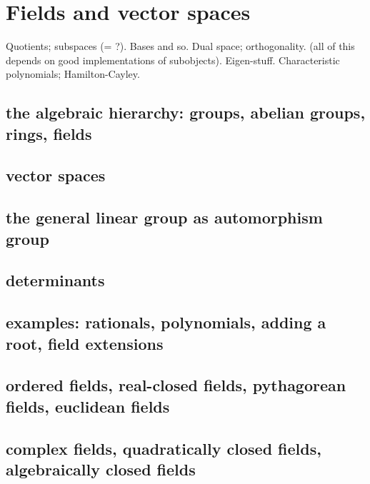 \chapter{Fields and vector spaces}
\label{ch:fields}

Quotients; subspaces (= ?). Bases and so. Dual space; orthogonality. (all of this depends on good implementations of subobjects). Eigen-stuff. Characteristic polynomials; Hamilton-Cayley.
\section{the algebraic hierarchy: groups, abelian groups, rings, fields}
\section{vector spaces}
\section{the general linear group as automorphism group}
\section{determinants\titledagger}
\section{examples: rationals, polynomials, adding a root, field extensions}
\section{ordered fields, real-closed fields, pythagorean fields, euclidean fields}
\section{complex fields, quadratically closed fields, algebraically closed fields}

